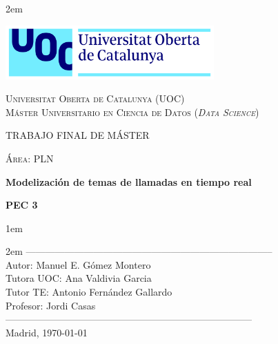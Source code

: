 \newpage
\thispagestyle{empty}

\baselineskip 2em


\centerline{\includegraphics[width=0.6\textwidth]{images/UOC-logo}}
\begin{center}
\textsc{Universitat Oberta de Catalunya (UOC) \\
 Máster Universitario en Ciencia de Datos (\textit{Data Science})\\}


\vspace*{1.5cm}

\textsc{\Large TRABAJO FINAL DE MÁSTER}

\vspace*{0.5cm}

\textsc{\large Área: PLN}



\vspace*{2.0cm}

\textbf{\Large Modelización de temas de llamadas en tiempo real}

\textbf{\large PEC 3}

\vspace{2.5cm}
\baselineskip 1em

\baselineskip 2em
-----------------------------------------------------------------------------\\
Autor:      Manuel E. Gómez Montero\\
Tutora UOC:      Ana Valdivia Garcia\\
Tutor TE:      Antonio Fernández Gallardo\\
Profesor:   Jordi Casas\\
-----------------------------------------------------------------------------\\
\vspace*{1.5cm}
Madrid, \today

\end{center}

\newpage
\pagestyle{empty}
\hfill
